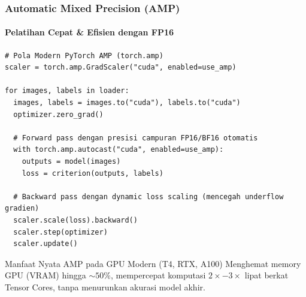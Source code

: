 \documentclass[t,aspectratio=169,xcolor=dvipsnames]{beamer}
\begin{document}
\begin{frame}[fragile]
  \frametitle{Automatic Mixed Precision (AMP)}
  \framesubtitle{Pelatihan Cepat \& Efisien dengan FP16}

\begin{lstlisting}[style=py]
# Pola Modern PyTorch AMP (torch.amp)
scaler = torch.amp.GradScaler("cuda", enabled=use_amp)

for images, labels in loader:
  images, labels = images.to("cuda"), labels.to("cuda")
  optimizer.zero_grad()

  # Forward pass dengan presisi campuran FP16/BF16 otomatis
  with torch.amp.autocast("cuda", enabled=use_amp):
    outputs = model(images)
    loss = criterion(outputs, labels)

  # Backward pass dengan dynamic loss scaling (mencegah underflow gradien)
  scaler.scale(loss).backward()
  scaler.step(optimizer)
  scaler.update()
\end{lstlisting}

  \begin{exampleblock}{Manfaat Nyata AMP pada GPU Modern (T4, RTX, A100)}
    \small
    Menghemat memory GPU (VRAM) hingga $\sim 50\%$, mempercepat komputasi $2\times - 3\times$ lipat berkat Tensor Cores, tanpa menurunkan akurasi model akhir.
  \end{exampleblock}
\end{frame}
\end{document}
